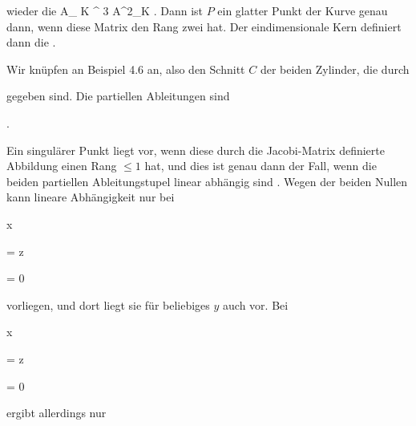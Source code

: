  wieder die  {}
 {{ {\mathbb A}_{ K }^{ 3  } }} {{\mathbb A}^{2}_{K}
} {.}
Dann ist $P$ ein glatter Punkt der Kurve genau dann, wenn diese Matrix den Rang zwei hat. Der eindimensionale Kern definiert dann die  {.}



{


Wir knüpfen an
Beispiel 4.6
an, also den Schnitt $C$ der beiden Zylinder, die durch


 {  }


gegeben sind. Die partiellen Ableitungen sind


 { . }


Ein singulärer Punkt liegt vor, wenn diese durch die Jacobi-Matrix definierte Abbildung einen Rang $\leq 1$ hat, und dies ist genau dann der Fall, wenn die beiden partiellen Ableitungstupel linear abhängig sind
 {} {.}
Wegen der beiden Nullen kann lineare Abhängigkeit nur bei


\mavergleichskette

{\vergleichskette

{ x
}

{ = }{ z
}

{ = }{ 0
}

{    }{
}

{   }{
}

}
{}{}{}
vorliegen, und dort liegt sie für beliebiges $y$ auch vor. Bei


\mavergleichskette

{\vergleichskette

{ x
}

{ = }{ z
}

{ = }{ 0
}

{    }{
}

{   }{
}

}
{}{}{}
ergibt allerdings nur


\mavergleichskette

}

